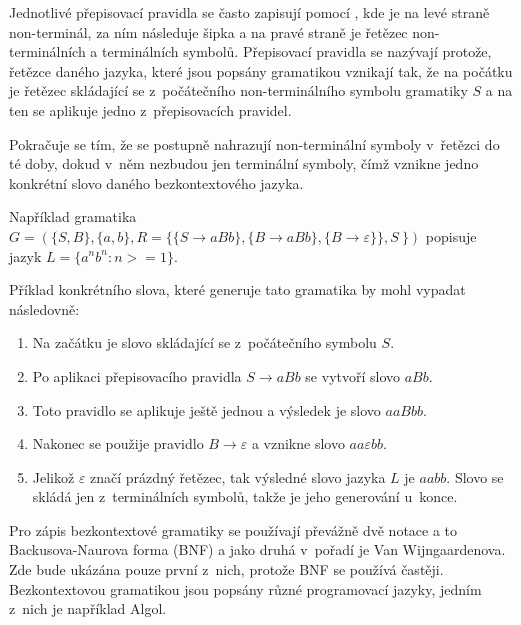 Jednotlivé přepisovací pravidla se často zapisují pomocí , kde je na levé straně non-terminál, za ním následuje šipka a na pravé straně je řetězec non-terminálních a terminálních symbolů. Přepisovací pravidla se nazývají protože, řetězce daného jazyka, které jsou popsány gramatikou vznikají tak, že na počátku je řetězec skládající se z~počátečního non-terminálního symbolu gramatiky \(S\) a na ten se aplikuje jedno z~přepisovacích pravidel. 

Pokračuje se tím, že se postupně nahrazují non-terminální symboly v~řetězci do té doby, dokud v~něm nezbudou jen terminální symboly, čímž vznikne jedno konkrétní slovo daného bezkontextového jazyka.

Například gramatika \( G = (\{S, B\}, \{ a, b\}, R = \{\{S \rightarrow aBb\}, \{B \rightarrow aBb\},\{B \rightarrow \varepsilon\}\}, S~\}) \) popisuje jazyk \( L = \{ a^n b^n : n >= 1 \}  \).

Příklad konkrétního slova, které generuje tato gramatika by mohl vypadat následovně:
\begin{enumerate}
	\item Na začátku je slovo skládající se z~počátečního symbolu \(S\).
	\item Po aplikaci přepisovacího pravidla \(S \rightarrow aBb\) se vytvoří slovo \(aBb\).
	\item Toto pravidlo se aplikuje ještě jednou a výsledek je slovo \(aaBbb\).
	\item Nakonec se použije pravidlo \(B \rightarrow \varepsilon \) a vznikne slovo \(aa\varepsilon bb\).
	\item Jelikož \(\varepsilon\) značí prázdný řetězec, tak výsledné slovo jazyka \(L\) je \(aabb\). Slovo se skládá jen z~terminálních symbolů, takže je jeho generování u~konce.
\end{enumerate}

Pro zápis bezkontextové gramatiky se používají převážně dvě notace a to Backusova-Naurova forma (BNF) a jako druhá v~pořadí je Van Wijngaardenova. Zde bude ukázána pouze první z~nich, protože BNF se používá častěji. Bezkontextovou gramatikou jsou popsány různé programovací jazyky, jedním z~nich je například Algol. \cite{CFG}

